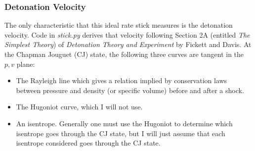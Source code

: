 \documentclass[11pt]{article}
\begin{document}
\subsubsection{Detonation Velocity}
\label{sec:det-vel}

The only characteristic that this ideal rate stick measures is the
detonation velocity.  Code in \emph{stick.py} derives that velocity
following Section 2A (entitled \emph{The Simplest Theory}) of
\emph{Detonation Theory and Experiment} by Fickett and
Davis\cite{FickettDavis}.  At the Chapman Jouguet (CJ) state, the
following three curves are tangent in the $p,v$ plane:
\begin{itemize}
\item The Rayleigh line which gives a relation implied by conservation
  laws between pressure and density (or specific volume) before and
  after a shock.
\item The Hugoniot curve, which I will not use.
\item An isentrope.  Generally one must use the Hugoniot to determine
  which isentrope goes through the CJ state, but I will just assume
  that each isentrope considered goes through the CJ state.
\end{itemize}
\end{document}
